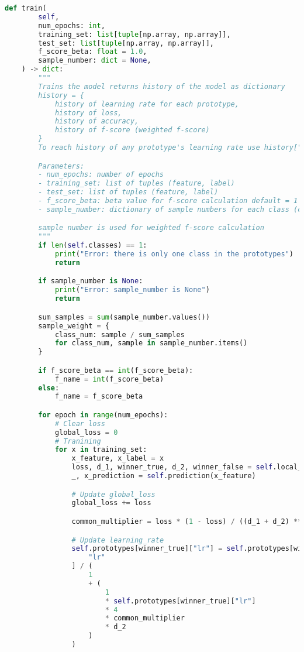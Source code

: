 \begin{lstlisting}[language = python]
    def train(
        self,
        num_epochs: int,
        training_set: list[tuple[np.array, np.array]],
        test_set: list[tuple[np.array, np.array]],
        f_score_beta: float = 1.0,
        sample_number: dict = None,
    ) -> dict:
        """
        Trains the model returns history of the model as dictionary
        history = {
            history of learning rate for each prototype,
            history of loss,
            history of accuracy,
            history of f-score (weighted f-score)
        }
        To reach history of any prototype's learning rate use history["lr"][prototype_number]

        Parameters:
        - num_epochs: number of epochs
        - training_set: list of tuples (feature, label)
        - test_set: list of tuples (feature, label)
        - f_score_beta: beta value for f-score calculation default = 1
        - sample_number: dictionary of sample numbers for each class (class_name: sample_number)

        sample number is used for weighted f-score calculation
        """
        if len(self.classes) == 1:
            print("Error: there is only one class in the prototypes")
            return

        if sample_number is None:
            print("Error: sample_number is None")
            return

        sum_samples = sum(sample_number.values())
        sample_weight = {
            class_num: sample / sum_samples
            for class_num, sample in sample_number.items()
        }

        if f_score_beta == int(f_score_beta):
            f_name = int(f_score_beta)
        else:
            f_name = f_score_beta

        for epoch in range(num_epochs):
            # Clear loss
            global_loss = 0
            # Tranining
            for x in training_set:
                x_feature, x_label = x
                loss, d_1, winner_true, d_2, winner_false = self.local_loss(x)
                _, x_prediction = self.prediction(x_feature)

                # Update global_loss
                global_loss += loss

                common_multiplier = loss * (1 - loss) / ((d_1 + d_2) ** 2)

                # Update learning_rate
                self.prototypes[winner_true]["lr"] = self.prototypes[winner_true][
                    "lr"
                ] / (
                    1
                    + (
                        1
                        * self.prototypes[winner_true]["lr"]
                        * 4
                        * common_multiplier
                        * d_2
                    )
                )


\end{lstlisting}

